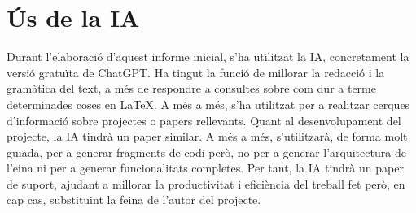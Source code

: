 \section*{Ús de la IA}
Durant l'elaboració d'aquest informe inicial, s'ha utilitzat la IA, concretament la versió gratuïta de ChatGPT. Ha tingut la funció de millorar la redacció i la gramàtica del text, a més de respondre a consultes sobre com dur a terme determinades coses en LaTeX. A més a més, s'ha utilitzat per a realitzar cerques d'informació sobre projectes o papers rellevants.
Quant al desenvolupament del projecte, la IA tindrà un paper similar. A més a més, s'utilitzarà, de forma molt guiada, per a generar fragments de codi però, no per a generar l'arquitectura de l'eina ni per a generar funcionalitats completes. Per tant, la IA tindrà un paper de suport, ajudant a millorar la productivitat i eficiència del treball fet però, en cap cas, substituint la feina de l'autor del projecte.

